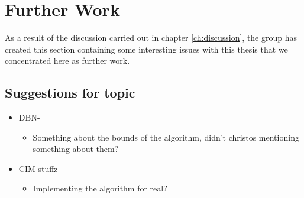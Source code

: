 \section{Further Work }

As a result of the discussion carried out in chapter \ref{ch:discussion}, the group has created this section containing some interesting issues with this thesis that we concentrated here as further work.







\subsection{Suggestions for topic}
\begin{itemize}
\item DBN-\etre
\begin{itemize}
\item Something about the bounds of the algorithm, didn't christos mentioning something about them?
\end{itemize}
\item CIM stuffz
\begin{itemize}
\item Implementing the algorithm for real?
\end{itemize}
\end{itemize}

